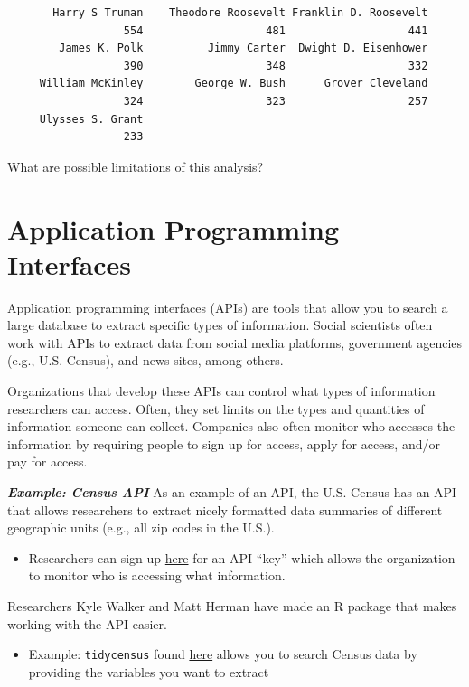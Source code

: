 \documentclass[
  letterpaper,
  DIV=11,
  numbers=noendperiod]{scrreprt}
\providecommand{\tightlist}{%
  \setlength{\itemsep}{0pt}\setlength{\parskip}{0pt}}\usepackage{longtable,booktabs,array}
\begin{document}
\begin{verbatim}
       Harry S Truman    Theodore Roosevelt Franklin D. Roosevelt 
                  554                   481                   441 
        James K. Polk          Jimmy Carter  Dwight D. Eisenhower 
                  390                   348                   332 
     William McKinley        George W. Bush      Grover Cleveland 
                  324                   323                   257 
     Ulysses S. Grant 
                  233 
\end{verbatim}

What are possible limitations of this analysis?

\hypertarget{application-programming-interfaces}{%
\section{Application Programming
Interfaces}\label{application-programming-interfaces}}

Application programming interfaces (APIs) are tools that allow you to
search a large database to extract specific types of information. Social
scientists often work with APIs to extract data from social media
platforms, government agencies (e.g., U.S. Census), and news sites,
among others.

Organizations that develop these APIs can control what types of
information researchers can access. Often, they set limits on the types
and quantities of information someone can collect. Companies also often
monitor who accesses the information by requiring people to sign up for
access, apply for access, and/or pay for access.

\textbf{\emph{Example: Census API}} As an example of an API, the U.S.
Census has an API that allows researchers to extract nicely formatted
data summaries of different geographic units (e.g., all zip codes in the
U.S.).

\begin{itemize}
\tightlist
\item
  Researchers can sign up
  \href{https://api.census.gov/data/key_signup.html}{here} for an API
  ``key'' which allows the organization to monitor who is accessing what
  information.
\end{itemize}

Researchers Kyle Walker and Matt Herman have made an R package that
makes working with the API easier.

\begin{itemize}
\tightlist
\item
  Example: \texttt{tidycensus} found
  \href{https://walker-data.com/tidycensus/articles/basic-usage.html}{here}
  allows you to search Census data by providing the variables you want
  to extract
\end{itemize}
\end{document}
